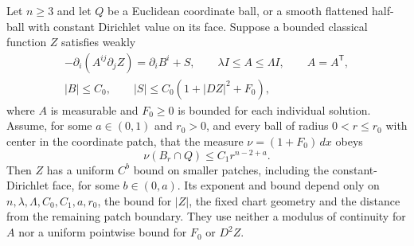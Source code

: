 \begin{lemma}
\label{lem:elliptic:natural-growth}
Let $n\ge3$ and let $Q$ be a Euclidean coordinate ball, or a smooth
flattened half-ball with constant Dirichlet value on its face.
Suppose a bounded classical function $Z$ satisfies weakly
\begin{equation}\label{eq:elliptic:natural-growth-model}
 \begin{gathered}
 -\partial_i(A^{ij}\partial_j Z)=\partial_i B^i+S,
 \qquad \lambda I\le A\le\Lambda I,\qquad A=A^{\mathsf T},\\
 |B|\le C_0,\qquad |S|\le C_0(1+|DZ|^2+F_0),
 \end{gathered}
\end{equation}
where $A$ is measurable and $F_0\ge0$ is bounded for each individual
solution.  Assume, for some $a\in(0,1)$ and $r_0>0$, and every ball
of radius $0<r\le r_0$ with center in the coordinate patch, that the measure
$\nu=(1+F_0)\,dx$ obeys
\begin{equation}\label{eq:elliptic:ng-source-morrey}
 \nu(B_r\cap Q)\le C_1r^{n-2+a}.
\end{equation}
Then $Z$ has a uniform $C^b$ bound on smaller patches, including the
constant-Dirichlet face, for some $b\in(0,a)$.  Its exponent and bound
depend only on $n,\lambda,\Lambda,C_0,C_1,a,r_0$, the bound for $|Z|$,
the fixed chart geometry and the distance from the remaining patch
boundary.  They use neither a modulus of continuity for $A$ nor a
uniform pointwise bound for $F_0$ or $D^2Z$.
\end{lemma}

